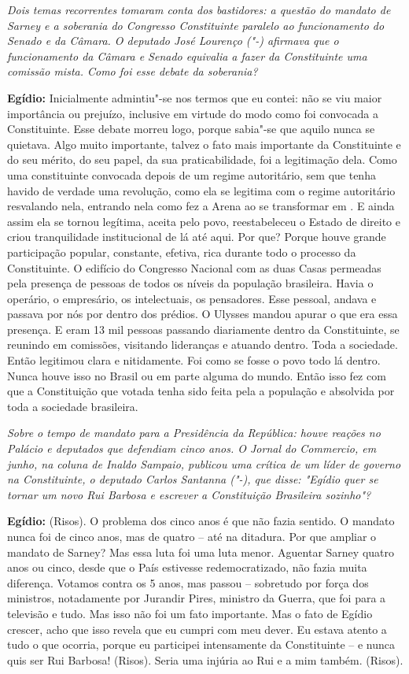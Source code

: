 \emph{Dois temas recorrentes tomaram conta dos bastidores: a questão
do mandato de Sarney e a soberania do Congresso Constituinte paralelo ao
funcionamento do Senado e da Câmara. O deputado José Lourenço ("-)
afirmava que o funcionamento da Câmara e Senado equivalia a fazer da
Constituinte uma comissão mista. Como foi esse debate da soberania?}

\textbf{Egídio:} Inicialmente admintiu"-se nos termos que eu contei: não
se viu maior importância ou prejuízo, inclusive em virtude do modo como
foi convocada a Constituinte. Esse debate morreu logo, porque sabia"-se
que aquilo nunca se quietava. Algo muito importante, talvez o fato mais
importante da Constituinte e do seu mérito, do seu papel, da sua
praticabilidade, foi a legitimação dela. Como uma constituinte convocada
depois de um regime autoritário, sem que tenha havido de verdade uma
revolução, como ela se legitima com o regime autoritário resvalando
nela, entrando nela como fez a Arena ao se transformar em . E ainda
assim ela se tornou legítima, aceita pelo povo, reestabeleceu o Estado
de direito e criou tranquilidade institucional de lá até aqui. Por que?
Porque houve grande participação popular, constante, efetiva, rica
durante todo o processo da Constituinte. O edifício do Congresso
Nacional com as duas Casas permeadas pela presença de pessoas de todos
os níveis da população brasileira. Havia o operário, o empresário, os
intelectuais, os pensadores. Esse pessoal, andava e passava por nós por
dentro dos prédios. O Ulysses mandou apurar o que era essa presença. E
eram 13 mil pessoas passando diariamente dentro da Constituinte, se
reunindo em comissões, visitando lideranças e atuando dentro. Toda a
sociedade. Então legitimou clara e nitidamente. Foi como se fosse o povo
todo lá dentro. Nunca houve isso no Brasil ou em parte alguma do mundo.
Então isso fez com que a Constituição que votada tenha sido feita pela a
população e absolvida por toda a sociedade brasileira.

\emph{Sobre o tempo de mandato para a Presidência da República: houve
reações no Palácio e deputados que defendiam cinco anos. O Jornal do
Commercio, em junho, na coluna de Inaldo Sampaio, publicou uma crítica
de um líder de governo na Constituinte, o deputado Carlos Santanna
("-), que disse: "Egídio quer se tornar um novo Rui Barbosa e
escrever a Constituição Brasileira sozinho"?}

\textbf{Egídio:} (Risos). O problema dos cinco anos é que não fazia
sentido. O mandato nunca foi de cinco anos, mas de quatro -- até na
ditadura. Por que ampliar o mandato de Sarney? Mas essa luta foi uma
luta menor. Aguentar Sarney quatro anos ou cinco, desde que o País
estivesse redemocratizado, não fazia muita diferença. Votamos contra os
5 anos, mas passou -- sobretudo por força dos ministros, notadamente por
Jurandir Pires, ministro da Guerra, que foi para a televisão e tudo. Mas
isso não foi um fato importante. Mas o fato de Egídio crescer, acho que
isso revela que eu cumpri com meu dever. Eu estava atento a tudo o que
ocorria, porque eu participei intensamente da Constituinte -- e nunca
quis ser Rui Barbosa! (Risos). Seria uma injúria ao Rui e a mim também.
(Risos).

